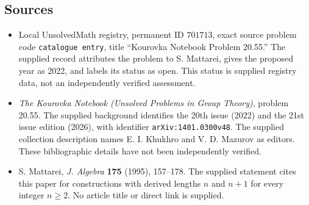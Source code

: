 \documentclass[11pt]{article}
\begin{document}
\subsection{Sources}
\begin{itemize}
\item Local UnsolvedMath registry, permanent ID \(701713\), exact source problem code \texttt{catalogue entry}, title ``Kourovka Notebook Problem 20.55.'' The supplied record attributes the problem to S. Mattarei, gives the proposed year as 2022, and labels its status as open. This status is supplied registry data, not an independently verified assessment.
\item \emph{The Kourovka Notebook (Unsolved Problems in Group Theory)}, problem 20.55. The supplied background identifies the 20th issue (2022) and the 21st issue edition (2026), with identifier \texttt{arXiv:1401.0300v48}. The supplied collection description names E. I. Khukhro and V. D. Mazurov as editors. These bibliographic details have not been independently verified.
\item S. Mattarei, \emph{J. Algebra} \textbf{175} (1995), 157--178. The supplied statement cites this paper for constructions with derived lengths \(n\) and \(n+1\) for every integer \(n\ge2\). No article title or direct link is supplied.
\end{itemize}
\end{document}
